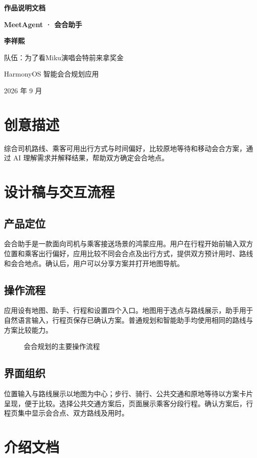 \documentclass[UTF8,a4paper,zihao=5,fontset=none,twoside]{ctexart}
\begin{document}
\begin{center}
{\bfseries 作品说明文档}\par\vspace{7pt}
{\bfseries MeetAgent · 会合助手}\par\vspace{9pt}
{\bfseries 李祥熙}\par\vspace{6pt}
队伍：为了看Miku演唱会特前来拿奖金\par
HarmonyOS 智能会合规划应用\par
2026 年 9 月
\end{center}
\section{创意描述}
综合司机路线、乘客可用出行方式与时间偏好，比较原地等待和移动会合方案，通过 AI 理解需求并解释结果，帮助双方确定会合地点。
\section{设计稿与交互流程}
\subsection{产品定位}
会合助手是一款面向司机与乘客接送场景的鸿蒙应用。用户在行程开始前输入双方位置和乘客出行偏好，应用比较不同会合点及出行方式，提供双方预计用时、路线和会合地点。确认后，用户可以分享方案并打开地图导航。
\subsection{操作流程}
应用设有地图、助手、行程和设置四个入口。地图用于选点与路线展示，助手用于自然语言输入，行程页保存已确认方案。普通规划和智能助手均使用相同的路线与方案比较能力。
\begin{figure}[H]\centering
{}
\caption{会合规划的主要操作流程}
\end{figure}
\subsection{界面组织}
位置输入与路线展示以地图为中心；步行、骑行、公共交通和原地等待以方案卡片呈现，便于比较。选择公共交通方案后，页面展示乘客分段行程。确认方案后，行程页集中显示会合点、双方路线及用时。
\clearpage
\section{介绍文档}

\end{document}

